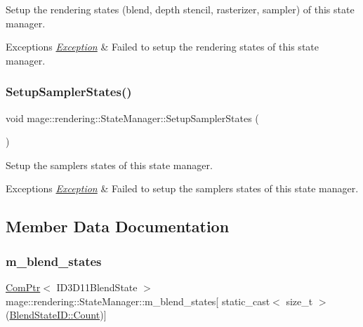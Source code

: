Setup the rendering states (blend, depth stencil, rasterizer, sampler) of this state manager.


\begin{DoxyExceptions}{Exceptions}
{\em \mbox{\hyperlink{classmage_1_1_exception}{Exception}}} & Failed to setup the rendering states of this state manager. \\
\hline
\end{DoxyExceptions}
\mbox{\label{classmage_1_1rendering_1_1_state_manager_abb74b460f834a402f9ab7527afa64f64}} 
\subsubsection{\texorpdfstring{Setup\+Sampler\+States()}{SetupSamplerStates()}}
{\footnotesize\ttfamily void mage\+::rendering\+::\+State\+Manager\+::\+Setup\+Sampler\+States (\begin{DoxyParamCaption}{ }\end{DoxyParamCaption})\hspace{0.3cm}{\ttfamily [private]}}

Setup the samplers states of this state manager.


\begin{DoxyExceptions}{Exceptions}
{\em \mbox{\hyperlink{classmage_1_1_exception}{Exception}}} & Failed to setup the samplers states of this state manager. \\
\hline
\end{DoxyExceptions}


\subsection{Member Data Documentation}
\mbox{\label{classmage_1_1rendering_1_1_state_manager_ad72e83edb0b28b1f03cf8a7dc231587e}} 
\subsubsection{\texorpdfstring{m\+\_\+blend\+\_\+states}{m\_blend\_states}}
{\footnotesize\ttfamily \mbox{\hyperlink{namespacemage_ae74f374780900893caa5555d1031fd79}{Com\+Ptr}}$<$ I\+D3\+D11\+Blend\+State $>$ mage\+::rendering\+::\+State\+Manager\+::m\+\_\+blend\+\_\+states\mbox{[} static\+\_\+cast$<$ size\+\_\+t $>$(\mbox{\hyperlink{namespacemage_1_1rendering_abdf11cdb816b9208aec6c3a81f7564abae93f994f01c537c4e2f7d8528c3eb5e9}{Blend\+State\+I\+D\+::\+Count}})\mbox{]}\hspace{0.3cm}{\ttfamily [private]}}

